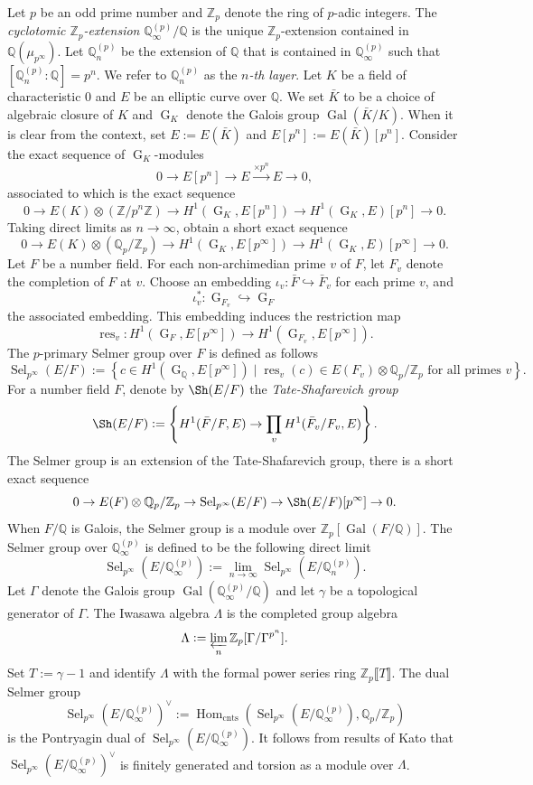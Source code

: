 \documentclass[11pt]{amsart}
\newcommand{\Z}{\mathbb{Z}}
\newcommand{\Q}{\mathbb{Q}}
\newcommand{\op}[1]{\operatorname{#1}}
\numberwithin{equation}{section}
\begin{document}
Let $p$ be an odd prime number and $\Z_p$ denote the ring of $p$-adic integers. The \emph{cyclotomic $\Z_p$-extension} $\Q_\infty^{(p)}/\Q$ is the unique $\Z_p$-extension contained in $\Q(\mu_{p^\infty})$. Let $\Q_n^{(p)}$ be the extension of $\Q$ that is contained in $\Q_\infty^{(p)}$ such that $[\Q_n^{(p)}:\Q]=p^n$. We refer to $\Q_n^{(p)}$ as the \emph{$n$-th layer}. Let $K$ be a field of characteristic $0$ and $E$ be an elliptic curve over $\Q$. We set $\bar{K}$ to be a choice of algebraic closure of $K$ and $\op{G}_K$ denote the Galois group $\op{Gal}(\bar{K}/K)$. When it is clear from the context, set $E:=E(\bar{K})$ and $E[p^n]:=E(\bar{K})[p^n]$. Consider the exact sequence of $\op{G}_K$-modules
\[0\rightarrow E[p^n]\rightarrow E\xrightarrow{\times p^n} E\rightarrow 0, \]
associated to which is the exact sequence
\[0\rightarrow E(K)\otimes \left(\Z/p^n\Z\right)\rightarrow H^1(\op{G}_K, E[p^n])\rightarrow H^1(\op{G}_K, E)[p^n]\rightarrow 0.\] Taking direct limits as $n\rightarrow \infty$, obtain a short exact sequence 
\[0\rightarrow E(K)\otimes \left(\Q_p/\Z_p\right)\rightarrow H^1(\op{G}_K, E[p^\infty])\rightarrow H^1(\op{G}_K, E)[p^\infty]\rightarrow 0. \]
Let $F$ be a number field. For each non-archimedian prime $v$ of $F$, let $F_v$ denote the completion of $F$ at $v$. Choose an embedding $\iota_v:\bar{F}\hookrightarrow \bar{F}_v$ for each prime $v$, and \[\iota_v^* : \op{G}_{F_v}\hookrightarrow \op{G}_F\] the associated embedding. This embedding induces the restriction map 
\[\op{res}_v: H^1(\op{G}_F, E[p^\infty])\rightarrow H^1(\op{G}_{F_v}, E[p^\infty]).\]  The $p$-primary Selmer group over $F$ is defined as follows
\[\op{Sel}_{p^\infty}(E/F):=\left\{c\in H^1(\op{G}_\Q, E[p^\infty])\mid \op{res}_v(c)\in E(F_v)\otimes \Q_p/\Z_p\text{ for all primes }v \right\}.\] 
For a number field $F$, denote by $\Sh(E/F)$ the \emph{Tate-Shafarevich group}
\[\Sh(E/F):=\left\{H^1(\bar{F}/F, E)\rightarrow \prod_{v} H^1(\bar{F}_v/F_v, E)\right\}.\]
The Selmer group is an extension of the Tate-Shafarevich group, there is a short exact sequence 
\begin{equation}\label{selmer ses}0\rightarrow E(F)\otimes \Q_p/\Z_p\rightarrow \op{Sel}_{p^{\infty}}(E/F)\rightarrow \Sh(E/F)[p^{\infty}]\rightarrow 0.\end{equation}When $F/\Q$ is Galois, the Selmer group is a module over $\Z_p[\op{Gal}(F/\Q)]$. The Selmer group over $\Q_\infty^{(p)}$ is defined to be the following direct limit
\[\op{Sel}_{p^\infty}(E/\Q_\infty^{(p)}):=\lim_{n\rightarrow \infty}\op{Sel}_{p^\infty}(E/\Q_n^{(p)}). \]
Let $\Gamma$ denote the Galois group $\op{Gal}(\Q_\infty^{(p)}/\Q)$ and let $\gamma$ be a topological generator of $\Gamma$. The Iwasawa algebra $\Lambda$ is the completed group algebra
\[\Lambda:=\varprojlim_n \Z_p[\Gamma/\Gamma^{p^n}]. \] Set $T:=\gamma-1$ and identify $\Lambda$ with the formal power series ring $\Z_p\llbracket T \rrbracket $. The dual Selmer group \[\op{Sel}_{p^\infty}(E/\Q_\infty^{(p)})^\vee:=\op{Hom}_{\op{cnts}}\left(\op{Sel}_{p^\infty}(E/\Q_\infty^{(p)}), \Q_p/\Z_p\right)\] is the Pontryagin dual of $\op{Sel}_{p^\infty}(E/\Q_\infty^{(p)})$. It follows from results of Kato \cite{kato2004p} that $\op{Sel}_{p^\infty}(E/\Q_\infty^{(p)})^\vee$ is finitely generated and torsion as a module over $\Lambda$. 
\end{document}
